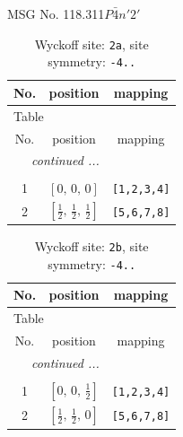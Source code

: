 \documentclass[fleqn,8pt]{jsarticle}
\begin{document}
\setcounter{MaxMatrixCols}{32}

\renewcommand{\tablename}{Table~}
\renewcommand{\figurename}{Figure~}
\begin{center}
\LARGE
MSG No. 118.311\quad$P\bar{4}n'2'$
\end{center}
\renewcommand{\arraystretch}{1.2}
\begin{longtable}{ccc}
\caption{Wyckoff site: {\tt 2a}, site symmetry: {\tt -4..}}
 \\
 \hline \hline
No. & position & mapping \\ \hline \endfirsthead

\multicolumn{2}{l}{\tablename\ \thetable{}} \\
 \hline \hline
No. & position & mapping \\ \hline \endhead

 \hline \hline
\multicolumn{2}{r}{\footnotesize\it continued ...} \\ \endfoot

 \hline \hline
\multicolumn{2}{r}{} \\ \endlastfoot

1 & $\left[ 0,\, 0,\, 0 \right]$ & {\tt [1,2,3,4]} \\ \hline
2 & $\left[ \frac{1}{2},\, \frac{1}{2},\, \frac{1}{2} \right]$ & {\tt [5,6,7,8]} \\
\end{longtable}
\renewcommand{\arraystretch}{1.2}
\begin{longtable}{ccc}
\caption{Wyckoff site: {\tt 2b}, site symmetry: {\tt -4..}}
 \\
 \hline \hline
No. & position & mapping \\ \hline \endfirsthead

\multicolumn{2}{l}{\tablename\ \thetable{}} \\
 \hline \hline
No. & position & mapping \\ \hline \endhead

 \hline \hline
\multicolumn{2}{r}{\footnotesize\it continued ...} \\ \endfoot

 \hline \hline
\multicolumn{2}{r}{} \\ \endlastfoot

1 & $\left[ 0,\, 0,\, \frac{1}{2} \right]$ & {\tt [1,2,3,4]} \\ \hline
2 & $\left[ \frac{1}{2},\, \frac{1}{2},\, 0 \right]$ & {\tt [5,6,7,8]} \\
\end{longtable}
\end{document}
